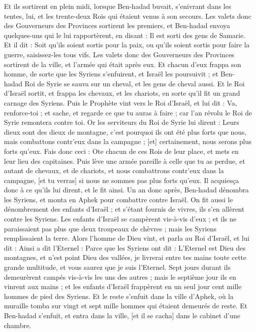 \begin{multicols}{2}
Et ils sortirent en plein midi, lorsque Ben-hadad buvait, s'enivrant dans les tentes, lui, et les trente-deux Rois qui étaient venus à son secours.
Les valets donc des Gouverneurs des Provinces sortirent les premiers, et Ben-hadad envoya quelques-uns qui le lui rapportèrent, en disant : Il est sorti des gens de Samarie.
Et il dit : Soit qu'ils soient sortis pour la paix, ou qu'ils soient sortis pour faire la guerre, saisissez-les tous vifs.
Les valets donc des Gouverneurs des Provinces sortirent de la ville, et l'armée qui était après eux.
Et chacun d'eux frappa son homme, de sorte que les Syriens s'enfuirent, et Israël les poursuivit ; et Ben-hadad Roi de Syrie se sauva sur un cheval, et les gens de cheval aussi.
Et le Roi d'Israël sortit, et frappa les chevaux, et les chariots, en sorte qu'il fit un grand carnage des Syriens.
Puis le Prophète vint vers le Roi d'Israël, et lui dit : Va, renforce-toi ; et sache, et regarde ce que tu auras à faire ; car l'an révolu le Roi de Syrie remontera contre toi.
Or les serviteurs du Roi de Syrie lui dirent : Leurs dieux sont des dieux de montagne, c'est pourquoi ils ont été plus forts que nous, mais combattons contr'eux dans la campagne ; [et] certainement, nous serons plus forts qu'eux.
Fais donc ceci : Ote chacun de ces Rois de leur place, et mets en leur lieu des capitaines.
Puis lève une armée pareille à celle que tu as perdue, et autant de chevaux, et de chariots, et nous combattrons contr'eux dans la campagne, [et tu verras] si nous ne sommes pas plus forts qu'eux. Il acquiesça donc à ce qu'ils lui dirent, et le fit ainsi.
Un an donc après, Ben-hadad dénombra les Syriens, et monta en Aphek pour combattre contre Israël.
On fit aussi le dénombrement des enfants d'Israël ; et s'étant fournis de vivres, ils s'en allèrent contre les Syriens. Les enfants d'Israël se campèrent vis-à-vis d'eux ; et ils ne paraissaient pas plus que deux troupeaux de chèvres ; mais les Syriens remplissaient la terre.
Alors l'homme de Dieu vint, et parla au Roi d'Israël, et lui dit : Ainsi a dit l'Eternel : Parce que les Syriens ont dit : L'Eternel est Dieu des montagnes, et n'est point Dieu des vallées, je livrerai entre tes mains toute cette grande multitude, et vous saurez que je suis l'Eternel.
Sept jours durant ils demeurèrent campés vis-à-vis les uns des autres ; mais le septième jour ils en vinrent aux mains ; et les enfants d'Israël frappèrent en un seul jour cent mille hommes de pied des Syriens.
Et le reste s'enfuit dans la ville d'Aphek, où la muraille tomba sur vingt et sept mille hommes qui étaient demeurés de reste. Et Ben-hadad s'enfuit, et entra dans la ville, [et il se cacha] dans le cabinet d'une chambre.

\end{multicols}
